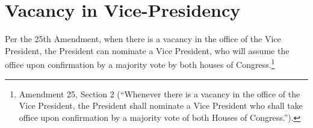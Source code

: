 \section{Vacancy in Vice-Presidency}
Per the 25th Amendment, when there is a vacancy in the office of the Vice President, the President can nominate a Vice President, who will assume the office upon confirmation by a majority vote by both houses of Congress.\footnote{Amendment 25, Section 2 (``Whenever there is a vacancy in the office of the Vice President, the President shall nominate a Vice President who shall take office upon confirmation by a majority vote of both Houses of Congress.'').}


